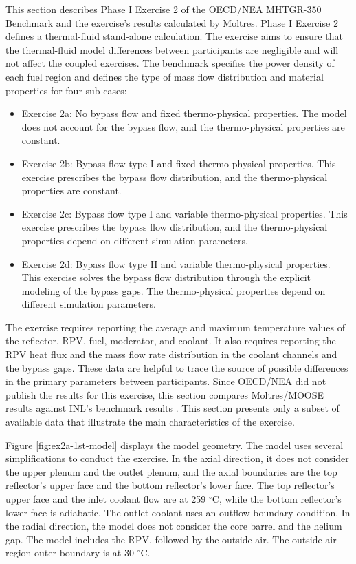 This section describes Phase I Exercise 2 of the OECD/NEA MHTGR-350 Benchmark \cite{oecd_nea_benchmark_2017} and the exercise's results calculated by Moltres.
Phase I Exercise 2 defines a thermal-fluid stand-alone calculation.
The exercise aims to ensure that the thermal-fluid model differences between participants are negligible and will not affect the coupled exercises.
The benchmark specifies the power density of each fuel region and defines the type of mass flow distribution and material properties for four sub-cases:
\begin{itemize}
  \item Exercise 2a: No bypass flow and fixed thermo-physical properties. The model does not account for the bypass flow, and the thermo-physical properties are constant.
  \item Exercise 2b: Bypass flow type I and fixed thermo-physical properties. This exercise prescribes the bypass flow distribution, and the thermo-physical properties are constant.
  \item Exercise 2c: Bypass flow type I and variable thermo-physical properties. This exercise prescribes the bypass flow distribution, and the thermo-physical properties depend on different simulation parameters.
  \item Exercise 2d: Bypass flow type II and variable thermo-physical properties. This exercise solves the bypass flow distribution through the explicit modeling of the bypass gaps. The thermo-physical properties depend on different simulation parameters.
\end{itemize}

The exercise requires reporting the average and maximum temperature values of the reflector, \gls{RPV}, fuel, moderator, and coolant.
It also requires reporting the RPV heat flux and the mass flow rate distribution in the coolant channels and the bypass gaps.
These data are helpful to trace the source of possible differences in the primary parameters between participants.
Since OECD/NEA did not publish the results for this exercise, this section compares Moltres/MOOSE results against INL's benchmark results \cite{strydom_inl_2013}.
This section presents only a subset of available data that illustrate the main characteristics of the exercise.

Figure \ref{fig:ex2a-1st-model} displays the model geometry.
The model uses several simplifications to conduct the exercise.
In the axial direction, it does not consider the upper plenum and the outlet plenum, and the axial boundaries are the top reflector's upper face and the bottom reflector's lower face.
The top reflector's upper face and the inlet coolant flow are at 259 $^{\circ}$C, while the bottom reflector's lower face is adiabatic.
The outlet coolant uses an outflow boundary condition.
In the radial direction, the model does not consider the core barrel and the helium gap.
The model includes the RPV, followed by the outside air.
The outside air region outer boundary is at 30 $^{\circ}$C.

